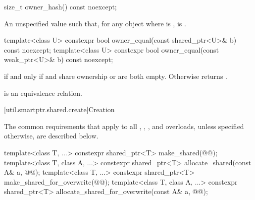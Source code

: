 %
\begin{itemdecl}
size_t owner_hash() const noexcept;
\end{itemdecl}

\begin{itemdescr}
\pnum
\returns
An unspecified value such that,
for any object  where  is ,
 is .
\end{itemdescr}

%
\begin{itemdecl}
template<class U>
  constexpr bool owner_equal(const shared_ptr<U>& b) const noexcept;
template<class U>
  constexpr bool owner_equal(const weak_ptr<U>& b) const noexcept;
\end{itemdecl}

\begin{itemdescr}
\pnum
\returns
{} if and only if
 and  share ownership or are both empty.
Otherwise returns .

\pnum
\remarks
{} is an equivalence relation.
\end{itemdescr}

[util.smartptr.shared.create]{Creation}

\pnum
The common requirements that apply to all
,
,
, and
 overloads,
unless specified otherwise, are described below.

%
%
\begin{itemdecl}
template<class T, ...>
  constexpr shared_ptr<T> make_shared(@@);
template<class T, class A, ...>
  constexpr shared_ptr<T> allocate_shared(const A& a, @@);
template<class T, ...>
  constexpr shared_ptr<T> make_shared_for_overwrite(@@);
template<class T, class A, ...>
  constexpr shared_ptr<T> allocate_shared_for_overwrite(const A& a, @@);
\end{itemdecl}

